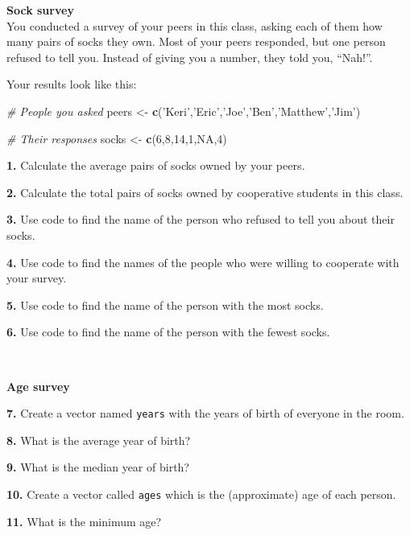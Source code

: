\documentclass[
]{book}
\newenvironment{Shaded}{\begin{snugshade}}{\end{snugshade}}
\newcommand{\CommentTok}[1]{\textcolor[rgb]{0.56,0.35,0.01}{\textit{#1}}}
\newcommand{\DecValTok}[1]{\textcolor[rgb]{0.00,0.00,0.81}{#1}}
\newcommand{\KeywordTok}[1]{\textcolor[rgb]{0.13,0.29,0.53}{\textbf{#1}}}
\newcommand{\NormalTok}[1]{#1}
\newcommand{\OtherTok}[1]{\textcolor[rgb]{0.56,0.35,0.01}{#1}}
\newcommand{\StringTok}[1]{\textcolor[rgb]{0.31,0.60,0.02}{#1}}
\begin{document}
\textbf{Sock survey}\\
You conducted a survey of your peers in this class, asking each of them how many pairs of socks they own. Most of your peers responded, but one person refused to tell you. Instead of giving you a number, they told you, ``Nah!''.

Your results look like this:

\begin{Shaded}
\begin{Highlighting}[]
\CommentTok{# People you asked}
\NormalTok{peers <-}\StringTok{ }\KeywordTok{c}\NormalTok{(}\StringTok{'Keri'}\NormalTok{,}\StringTok{'Eric'}\NormalTok{,}\StringTok{'Joe'}\NormalTok{,}\StringTok{'Ben'}\NormalTok{,}\StringTok{'Matthew'}\NormalTok{,}\StringTok{'Jim'}\NormalTok{)}

\CommentTok{# Their responses}
\NormalTok{socks <-}\StringTok{ }\KeywordTok{c}\NormalTok{(}\DecValTok{6}\NormalTok{,}\DecValTok{8}\NormalTok{,}\DecValTok{14}\NormalTok{,}\DecValTok{1}\NormalTok{,}\OtherTok{NA}\NormalTok{,}\DecValTok{4}\NormalTok{)}
\end{Highlighting}
\end{Shaded}

\textbf{1.} Calculate the average pairs of socks owned by your peers.

\textbf{2.} Calculate the total pairs of socks owned by cooperative students in this class.

\textbf{3.} Use code to find the name of the person who refused to tell you about their socks.

\textbf{4.} Use code to find the names of the people who were willing to cooperate with your survey.

\textbf{5.} Use code to find the name of the person with the most socks.

\textbf{6.} Use code to find the name of the person with the fewest socks.

~

\textbf{Age survey}

\textbf{7.} Create a vector named \texttt{years} with the years of birth of everyone in the room.

\textbf{8.} What is the average year of birth?

\textbf{9.} What is the median year of birth?

\textbf{10.} Create a vector called \texttt{ages} which is the (approximate) age of each person.

\textbf{11.} What is the minimum age?
\end{document}
